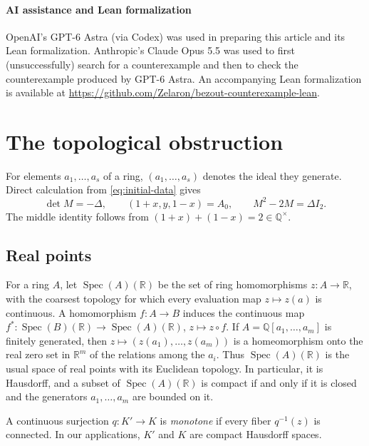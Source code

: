 \documentclass[11pt]{amsart}
\numberwithin{equation}{section}
\theoremstyle{definition}
\newcommand{\Q}{\mathbb{Q}}
\newcommand{\R}{\mathbb{R}}
\DeclareMathOperator{\Spec}{Spec}
\begin{document}
\bigskip

\paragraph{\textbf{AI assistance and Lean formalization}} OpenAI's GPT-6 Astra (via Codex) was used in preparing this article and its Lean formalization. Anthropic's Claude Opus 5.5 was used to first (unsuccessfully) search for a counterexample and then to check the counterexample produced by GPT-6 Astra. An accompanying Lean formalization is available at
\url{https://github.com/Zelaron/bezout-counterexample-lean}.

\bigskip

\section{The topological obstruction}\label{sec:topology}

For elements $a_1,\ldots,a_s$ of a ring, $(a_1,\ldots,a_s)$ denotes the ideal they generate. Direct calculation from \eqref{eq:initial-data} gives
\begin{equation}\label{eq:matrix-identities}
  \det M=-\Delta,\qquad
  (1+x,y,1-x)=A_0,\qquad
  M^2-2M=\Delta I_2.
\end{equation}
The middle identity follows from $(1+x)+(1-x)=2\in\Q^\times$.

\subsection{Real points}\label{subsec:real-points}
For a ring $A$, let $\Spec(A)(\R)$ be the set of ring homomorphisms $z:A\to\R$, with the coarsest topology for which every evaluation map $z\mapsto z(a)$ is continuous. A homomorphism $f:A\to B$ induces the continuous map $f^*:\Spec(B)(\R)\to\Spec(A)(\R)$, $z\mapsto z\circ f$. If $A=\Q[a_1,\ldots,a_m]$ is finitely generated, then $z\mapsto(z(a_1),\ldots,z(a_m))$ is a homeomorphism onto the real zero set in $\R^m$ of the relations among the $a_i$. Thus $\Spec(A)(\R)$ is the usual space of real points with its Euclidean topology. In particular, it is Hausdorff, and a subset of $\Spec(A)(\R)$ is compact if and only if it is closed and the generators $a_1,\ldots,a_m$ are bounded on it.

A continuous surjection $q:K'\to K$ is \emph{monotone} if every fiber $q^{-1}(z)$ is connected. In our applications, $K'$ and $K$ are compact Hausdorff spaces.
\end{document}
